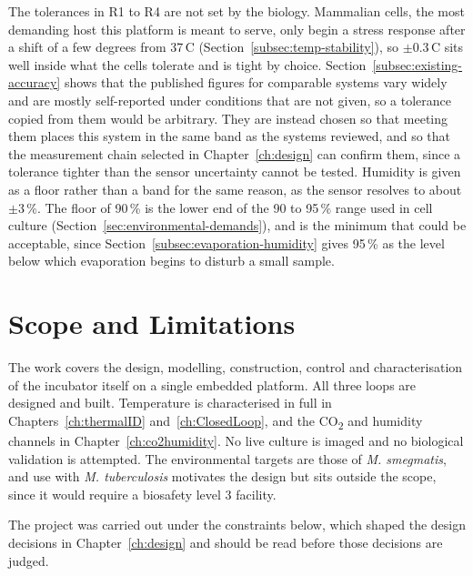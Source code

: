 The tolerances in R1 to R4 are not set by the biology. Mammalian cells, the most demanding host this platform is meant to serve, only begin a stress response after a shift of a few degrees from 37\,\textdegree{}C (Section~\ref{subsec:temp-stability}), so $\pm$0.3\,\textdegree{}C sits well inside what the cells tolerate and is tight by choice. Section~\ref{subsec:existing-accuracy} shows that the published figures for comparable systems vary widely and are mostly self-reported under conditions that are not given, so a tolerance copied from them would be arbitrary. They are instead chosen so that meeting them places this system in the same band as the systems reviewed, and so that the measurement chain selected in Chapter~\ref{ch:design} can confirm them, since a tolerance tighter than the sensor uncertainty cannot be tested. Humidity is given as a floor rather than a band for the same reason, as the sensor resolves to about $\pm$3\,\%. The floor of 90\,\% is the lower end of the 90 to 95\,\% range used in cell culture (Section~\ref{sec:environmental-demands}), and is the minimum that could be acceptable, since Section~\ref{subsec:evaporation-humidity} gives 95\,\% as the level below which evaporation begins to disturb a small sample.

\section{Scope and Limitations}
\label{sec:scope}

The work covers the design, modelling, construction, control and characterisation of the incubator itself on a single embedded platform. All three loops are designed and built. Temperature is characterised in full in Chapters~\ref{ch:thermalID} and~\ref{ch:ClosedLoop}, and the CO\textsubscript{2} and humidity channels in Chapter~\ref{ch:co2humidity}. No live culture is imaged and no biological validation is attempted. The environmental targets are those of \textit{M. smegmatis}, and use with \textit{M. tuberculosis} motivates the design but sits outside the scope, since it would require a biosafety level 3 facility.

The project was carried out under the constraints below, which shaped the design decisions in Chapter~\ref{ch:design} and should be read before those decisions are judged.

